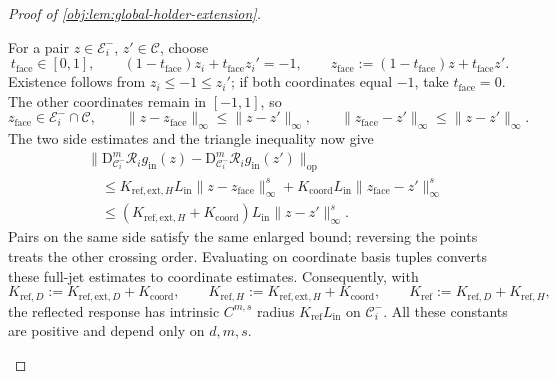 \documentclass[11pt]{article}
\begin{document}
\begin{proof}[Proof of \cref{obj:lem:global-holder-extension}]
\begin{enumerate}
For a pair \(z\in\mathcal E_i^-\), \(z'\in\mathcal C\), choose
\[
t_{\mathrm{face}}\in[0,1],
\qquad
(1-t_{\mathrm{face}})z_i+t_{\mathrm{face}}z_i'=-1,
\qquad
z_{\mathrm{face}}:=(1-t_{\mathrm{face}})z+t_{\mathrm{face}}z'.
\]
Existence follows from \(z_i\le-1\le z_i'\); if both coordinates equal \(-1\), take \(t_{\mathrm{face}}=0\). The other coordinates remain in \([-1,1]\), so
\[
z_{\mathrm{face}}\in\mathcal E_i^-\cap\mathcal C,
\qquad
\|z-z_{\mathrm{face}}\|_\infty\le\|z-z'\|_\infty,
\qquad
\|z_{\mathrm{face}}-z'\|_\infty\le\|z-z'\|_\infty.
\]
The two side estimates and the triangle inequality now give
\[
\begin{aligned}
&\|\mathrm D_{\mathcal C_i^-}^m\mathscr R_i g_{\mathrm{in}}(z)
-\mathrm D_{\mathcal C_i^-}^m\mathscr R_i g_{\mathrm{in}}(z')\|_{\mathrm{op}}\\
&\quad\le
K_{\mathrm{ref},\mathrm{ext},H}L_{\mathrm{in}}
\|z-z_{\mathrm{face}}\|_\infty^s
+K_{\mathrm{coord}}L_{\mathrm{in}}
\|z_{\mathrm{face}}-z'\|_\infty^s\\
&\quad\le
(K_{\mathrm{ref},\mathrm{ext},H}+K_{\mathrm{coord}})
L_{\mathrm{in}}\|z-z'\|_\infty^s.
\end{aligned}
\]
Pairs on the same side satisfy the same enlarged bound; reversing the points treats the other crossing order. Evaluating on coordinate basis tuples converts these full-jet estimates to coordinate estimates. Consequently, with
\[
K_{\mathrm{ref},D}
:=K_{\mathrm{ref},\mathrm{ext},D}+K_{\mathrm{coord}},
\qquad
K_{\mathrm{ref},H}
:=K_{\mathrm{ref},\mathrm{ext},H}+K_{\mathrm{coord}},
\qquad
K_{\mathrm{ref}}:=K_{\mathrm{ref},D}+K_{\mathrm{ref},H},
\]
the reflected response has intrinsic \(C^{m,s}\) radius
\(K_{\mathrm{ref}}L_{\mathrm{in}}\) on \(\mathcal C_i^-\). All these constants are positive and depend only on \(d,m,s\).


\end{enumerate}
\end{proof}
\end{document}
